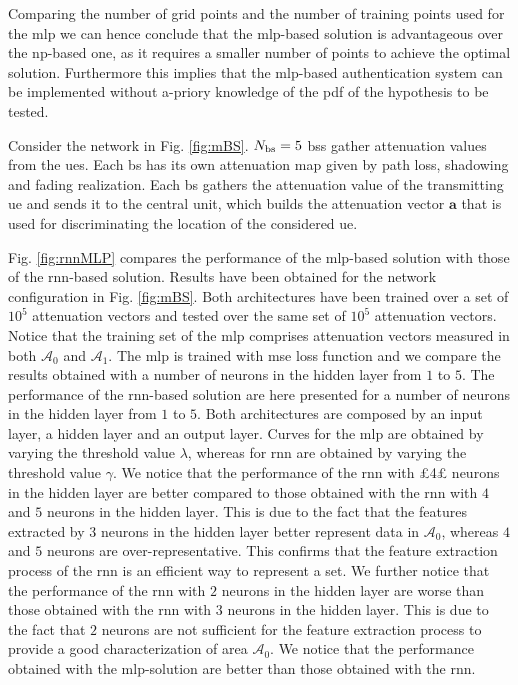 \documentclass[draftcls,onecolumn,12pt]{IEEEtran}
\begin{document}
Comparing the number of grid points and the number of training points used for the \ac{mlp} we can hence conclude that the \ac{mlp}-based solution is advantageous over the \ac{np}-based one, as it requires a smaller number of points to achieve the optimal solution. Furthermore this implies that the \ac{mlp}-based authentication system can be implemented without a-priory knowledge of the \ac{pdf} of the hypothesis to be tested.

Consider the network in Fig. \ref{fig:mBS}. $N_{\rm bs}=5$ \acp{bs} gather attenuation values from the \acp{ue}. Each \ac{bs} has its own attenuation map given by path loss, shadowing and fading realization. Each \ac{bs} gathers the attenuation value of the transmitting \ac{ue} and sends it to the central unit, which builds the attenuation vector $\bm{a}$ that is used for discriminating the location of the considered \ac{ue}.

Fig. \ref{fig:rnnMLP} compares the performance of the \ac{mlp}-based solution with those of the \ac{rnn}-based solution. Results have been obtained for the network configuration in Fig. \ref{fig:mBS}. Both architectures have been trained over a set of $10^5$ attenuation vectors and tested over the same set of $10^5$ attenuation vectors. Notice that the training set of the \ac{mlp} comprises attenuation vectors measured in both $\mathcal{A}_0$ and $\mathcal{A}_1$. The \ac{mlp} is trained with \ac{mse} loss function and we compare the results obtained with a number of neurons in the hidden layer from $1$ to $5$. The performance of the \ac{rnn}-based solution are here presented for a number of neurons in the hidden layer from $1$ to $5$. Both architectures are composed by an input layer, a hidden layer and an output layer. Curves for the \ac{mlp} are obtained by varying the threshold value $\lambda$, whereas for \ac{rnn} are obtained by varying the threshold value $\gamma$. We notice that the performance of the \ac{rnn} with £4£ neurons in the hidden layer are better compared to those obtained with the \ac{rnn} with $4$ and $5$ neurons in the hidden layer. This is due to the fact that the features extracted by $3$ neurons in the hidden layer better represent data in $\mathcal{A}_0$, whereas $4$ and $5$ neurons are over-representative. This confirms that the feature extraction process of the \ac{rnn} is an efficient way to represent a set. We further notice that the performance of the \ac{rnn} with $2$ neurons in the hidden layer are worse than those obtained with the \ac{rnn} with $3$ neurons in the hidden layer. This is due to the fact that $2$ neurons are not sufficient for the feature extraction process to provide a good characterization of area $\mathcal{A}_0$. We notice that the performance obtained with the \ac{mlp}-solution are better than those obtained with the \ac{rnn}. 
\end{document}
